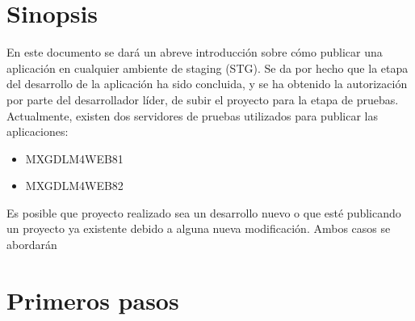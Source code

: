 \documentclass[12pt,a4paper]{article}
\begin{document}
	\section{Sinopsis}
	En este documento se dará un abreve introducción sobre cómo publicar una aplicación en cualquier ambiente de staging (STG). Se da por hecho que la etapa del desarrollo de la aplicación ha sido concluida, y se ha obtenido la autorización por parte del desarrollador líder, de subir el proyecto para la etapa de pruebas.\\
	
	\noindent Actualmente, existen dos servidores de pruebas utilizados para publicar las aplicaciones:
	\begin{itemize}
		\item MXGDLM4WEB81
		\item MXGDLM4WEB82
	\end{itemize}
	
	Es posible que proyecto realizado sea un desarrollo nuevo o que esté publicando un proyecto ya existente debido a alguna nueva modificación. Ambos casos se abordarán   
	
	\section{Primeros pasos}
	
	
\end{document}
